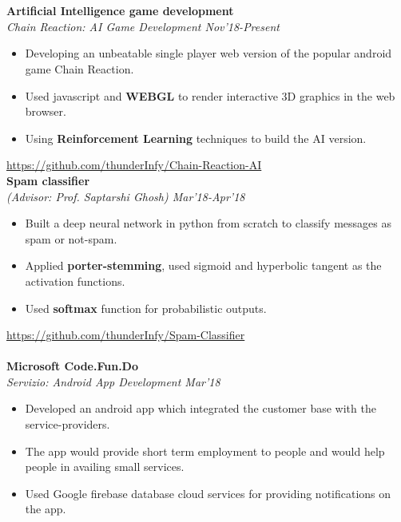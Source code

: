 \documentclass[letter,10pt]{book}
\begin{document}
\\\\
\large \textbf{Artificial Intelligence game development} \normalsize\\
\emph{Chain Reaction: AI Game Development \hfill Nov'18-Present}
\enlargethispage{4\baselineskip}\\[-2em]
\begin{itemize}
\item Developing an unbeatable single player web version of the popular android game Chain Reaction.\\[-2em] 
\item Used javascript and  \textbf{WEBGL} to render interactive 3D graphics in the web browser. \\[-2em]
\item Using \textbf{Reinforcement Learning} techniques to build the AI version.\\[-1.8em] 
\end{itemize}
\href{https://github.com/thunderInfy/Chain-Reaction-AI}{https://github.com/thunderInfy/Chain-Reaction-AI}
\pagebreak
\\
\large \textbf{Spam classifier} \normalsize\\
\emph{(Advisor: Prof. Saptarshi Ghosh) \hfill Mar'18-Apr'18} \\[-2em] 
\begin{itemize}
\item Built a deep neural network in python from scratch to classify messages as spam or not-spam.\\[-2em]
\item Applied  \textbf{porter-stemming}, used sigmoid and hyperbolic tangent as the activation functions.\\[-2em] 
\item Used  \textbf{softmax} function for probabilistic outputs.\\[-1.8em]
\end{itemize}
\href{https://github.com/thunderInfy/Spam-Classifier}{https://github.com/thunderInfy/Spam-Classifier}
\\\\
\large \textbf{Microsoft Code.Fun.Do} \normalsize\\
\emph{Servizio: Android App Development \hfill Mar'18} \\[-2em]
\begin{itemize}
\item Developed an android app which integrated the customer base with the service-providers.\\[-2em]
\item The app would provide short term employment to people and would help people in availing small services.\\[-2em]
\item Used Google firebase database cloud services for providing notifications on the app.\\[-1.8em]
\end{itemize}
\end{document}
